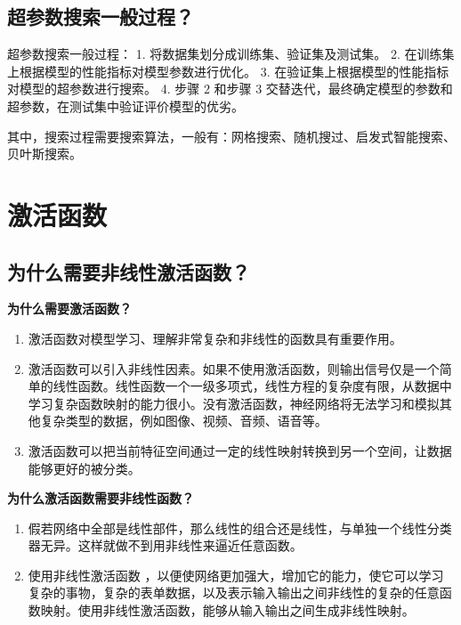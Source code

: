 \subsection{超参数搜索一般过程？}\label{ux8d85ux53c2ux6570ux641cux7d22ux4e00ux822cux8fc7ux7a0b}

超参数搜索一般过程： 1. 将数据集划分成训练集、验证集及测试集。 2.
在训练集上根据模型的性能指标对模型参数进行优化。 3.
在验证集上根据模型的性能指标对模型的超参数进行搜索。 4. 步骤 2 和步骤 3
交替迭代，最终确定模型的参数和超参数，在测试集中验证评价模型的优劣。

其中，搜索过程需要搜索算法，一般有：网格搜索、随机搜过、启发式智能搜索、贝叶斯搜索。

\section{ 激活函数}\label{ux6fc0ux6d3bux51fdux6570}

\subsection{为什么需要非线性激活函数？}\label{ux4e3aux4ec0ux4e48ux9700ux8981ux975eux7ebfux6027ux6fc0ux6d3bux51fdux6570}

\textbf{为什么需要激活函数？}

\begin{enumerate}
\def\labelenumi{\arabic{enumi}.}
 
\item
  激活函数对模型学习、理解非常复杂和非线性的函数具有重要作用。
\item
  激活函数可以引入非线性因素。如果不使用激活函数，则输出信号仅是一个简单的线性函数。线性函数一个一级多项式，线性方程的复杂度有限，从数据中学习复杂函数映射的能力很小。没有激活函数，神经网络将无法学习和模拟其他复杂类型的数据，例如图像、视频、音频、语音等。
\item
  激活函数可以把当前特征空间通过一定的线性映射转换到另一个空间，让数据能够更好的被分类。
\end{enumerate}

\textbf{为什么激活函数需要非线性函数？}

\begin{enumerate}
\def\labelenumi{\arabic{enumi}.}
 
\item
  假若网络中全部是线性部件，那么线性的组合还是线性，与单独一个线性分类器无异。这样就做不到用非线性来逼近任意函数。
\item
  使用非线性激活函数
  ，以便使网络更加强大，增加它的能力，使它可以学习复杂的事物，复杂的表单数据，以及表示输入输出之间非线性的复杂的任意函数映射。使用非线性激活函数，能够从输入输出之间生成非线性映射。
\end{enumerate}

